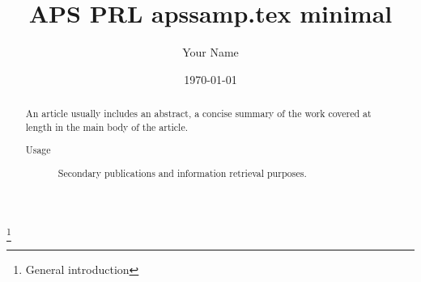 \usepackage{graphicx}%
\usepackage{dcolumn}%
\usepackage{bm}%
\usepackage{hyperref}%

\usepackage[mathlines]{lineno}%
\linenumbers\relax %


\usepackage[a4paper, total={6in, 8in}]{geometry}


%
\usepackage[english, german]{babel}
\usepackage[T1, T2A]{fontenc}
%





\title{\textsc{APS} PRL apssamp.tex minimal}%
\thanks{General introduction}%

\author{Your Name}
%

\date{\today}%

\begin{abstract}
An article usually includes an abstract, a concise summary of the work
covered at length in the main body of the article. %
\begin{description}
\item[Usage]
Secondary publications and information retrieval purposes.
\end{description}
\end{abstract}

